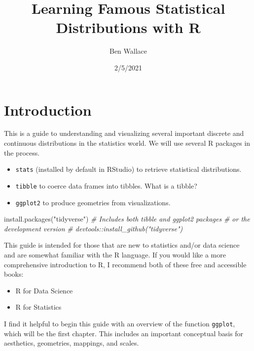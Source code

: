 \documentclass[
]{book}
\title{Learning Famous Statistical Distributions with R}
\author{Ben Wallace}
\date{2/5/2021}
\newenvironment{Shaded}{\begin{snugshade}}{\end{snugshade}}
\newcommand{\CommentTok}[1]{\textcolor[rgb]{0.56,0.35,0.01}{\textit{#1}}}
\newcommand{\FunctionTok}[1]{\textcolor[rgb]{0.00,0.00,0.00}{#1}}
\newcommand{\NormalTok}[1]{#1}
\newcommand{\StringTok}[1]{\textcolor[rgb]{0.31,0.60,0.02}{#1}}
\providecommand{\tightlist}{%
  \setlength{\itemsep}{0pt}\setlength{\parskip}{0pt}}
\begin{document}
\maketitle

{
\setcounter{tocdepth}{1}
\tableofcontents
}
\hypertarget{introduction}{%
\chapter{Introduction}\label{introduction}}

This is a guide to understanding and visualizing several important discrete and continuous distributions in the statistics world. We will use several R packages in the process.

\begin{itemize}
\tightlist
\item
  \texttt{stats} (installed by default in RStudio) to retrieve statistical distributions.
\item
  \texttt{tibble} to coerce data frames into tibbles. What is a tibble?
\item
  \texttt{ggplot2} to produce geometries from visualizations.
\end{itemize}

\begin{Shaded}
\begin{Highlighting}[]
\FunctionTok{install.packages}\NormalTok{(}\StringTok{"tidyverse"}\NormalTok{) }\CommentTok{\# Includes both tibble and ggplot2 packages}
\CommentTok{\# or the development version}
\CommentTok{\# devtools::install\_github("tidyverse")}
\end{Highlighting}
\end{Shaded}

This guide is intended for those that are new to statistics and/or data science and are somewhat familiar with the R language. If you would like a more comprehensive introduction to R, I recommend both of these free and accessible books:

\begin{itemize}
\tightlist
\item
  R for Data Science
\item
  R for Statistics
\end{itemize}

I find it helpful to begin this guide with an overview of the function \texttt{ggplot}, which will be the first chapter. This includes an important conceptual basis for aesthetics, geometries, mappings, and scales.
\end{document}
